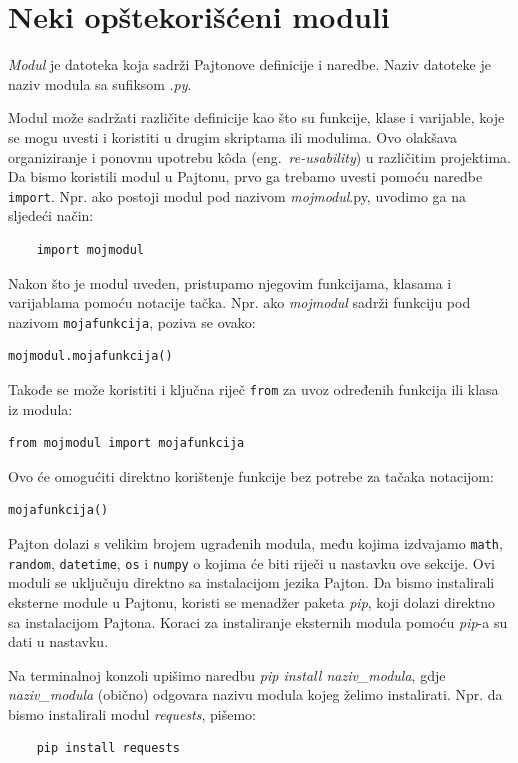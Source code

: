 \section{Neki opštekorišćeni moduli}

\textit{Modul} je datoteka koja sadrži Pajtonove definicije i naredbe. Naziv datoteke je naziv modula sa sufiksom .\textit{py}.

Modul može sadržati različite definicije kao što su funkcije, klase i varijable, koje se mogu uvesti i koristiti u drugim skriptama ili modulima. Ovo olakšava organiziranje i ponovnu upotrebu k\^oda (eng.\ \emph{re-usability}) u različitim projektima.\\

Da bismo koristili modul u Pajtonu, prvo ga trebamo uvesti pomoću naredbe \texttt{import}. Npr. ako postoji modul pod nazivom \textit{mojmodul}.py, uvodimo  ga na sljedeći način:
\begin{verbatim}
	import mojmodul
\end{verbatim}


Nakon što je modul uveden, pristupamo njegovim funkcijama, kla\-sama i varijablama pomoću notacije tačka. Npr. ako \textit{mojmodul} sadrži funkciju pod nazivom \texttt{mojafunkcija}, poziva se ovako:
\begin{verbatim}
mojmodul.mojafunkcija()
\end{verbatim}

Takođe se može koristiti i ključna riječ \texttt{from} za uvoz određenih funkcija ili klasa iz modula:
\begin{verbatim}
from mojmodul import mojafunkcija
\end{verbatim}

Ovo će omogućiti direktno korištenje funkcije bez potrebe za tačaka notacijom:

\begin{verbatim}
mojafunkcija()
\end{verbatim}

Pajton dolazi s velikim brojem ugrađenih modula, među kojima izdva\-jamo \texttt{math}, \texttt{random}, \texttt{datetime}, \texttt{os} i \texttt{numpy} o kojima će biti riječi u nastavku ove sekcije. Ovi moduli se uključuju direktno sa instalacijom jezika Pajton.  Da bismo instalirali eksterne module u Pajtonu,   koristi se menadžer paketa \textit{pip}, koji dolazi direktno sa instalacijom Pajtona. Koraci za instaliranje eksternih modula pomoću \emph{pip}-a su dati u nastavku. 

Na terminalnoj konzoli upišimo naredbu \textit{pip install naziv\_modula}, gdje  \textit{naziv\_modula} (obično) odgovara nazivu  modula kojeg želimo insta\-lirati. Npr. da bismo instalirali modul \textit{requests}, pišemo:
\begin{verbatim}
    pip install requests
\end{verbatim}


